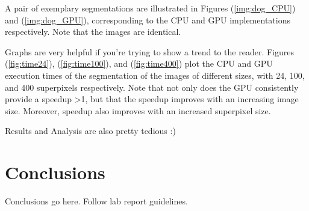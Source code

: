 \documentclass[CMPE]{KGCOEReport}
\begin{document}

A pair of exemplary segmentations are illustrated in Figures (\ref{img:dog_CPU}) and (\ref{img:dog_GPU}), corresponding to the CPU and GPU implementations respectively. Note that the images are identical.


Graphs are very helpful if you're trying to show a trend to the reader. Figures (\ref{fig:time24}), (\ref{fig:time100}), and (\ref{fig:time400}) plot the CPU and GPU execution times of the segmentation of the images of different sizes, with 24, 100, and 400 superpixels respectively. Note that not only does the GPU consistently provide a speedup >1, but that the speedup improves with an increasing image size. Moreover, speedup also improves with an increased superpixel size.


Results and Analysis are also pretty tedious :)\\


\section{Conclusions}
Conclusions go here. Follow lab report guidelines.\\


\end{document}
